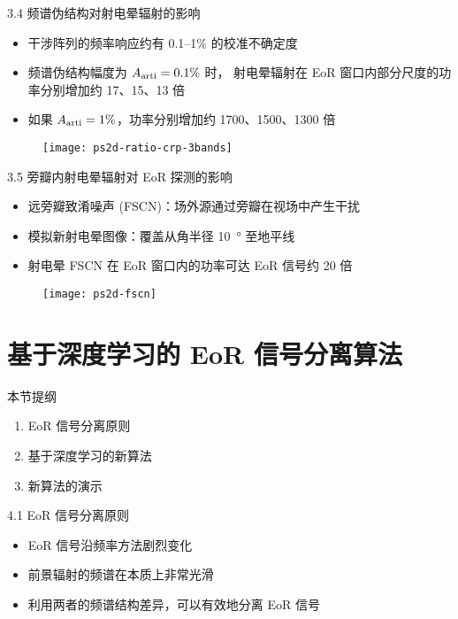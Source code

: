 \documentclass{beamer}
\begin{document}
\begin{frame}{3.4 频谱伪结构对射电晕辐射的影响}
  \begin{itemize}
    \item 干涉阵列的频率响应约有 0.1--1\% 的校准不确定度
    \item 频谱伪结构幅度为 $A_{\text{arti}} = 0.1\%$ 时，
      射电晕辐射在 EoR 窗口内部分尺度的功率分别增加约 17、15、13 倍
    \item 如果 $A_{\text{arti}} = 1\%$，功率分别增加约 1700、1500、1300 倍
  \end{itemize}
  \begin{figure}
    \centering
    \texttt{[image: ps2d-ratio-crp-3bands]}
  \end{figure}
\end{frame}

\begin{frame}{3.5 旁瓣内射电晕辐射对 EoR 探测的影响}
  \begin{itemize}
    \item \alert{远旁瓣致淆噪声 (FSCN)}：场外源通过旁瓣在视场中产生干扰
    \item 模拟新射电晕图像：覆盖从角半径 \SI{10}{\degree} 至地平线
    \item 射电晕 FSCN 在 EoR 窗口内的功率可达 EoR 信号约 20 倍
  \end{itemize}
  \begin{figure}
    \centering
    \texttt{[image: ps2d-fscn]}
  \end{figure}
\end{frame}


\section{基于深度学习的 EoR 信号分离算法}

\begin{frame}
  \begin{block}{本节提纲}
  \begin{enumerate}
    \item EoR 信号分离原则
    \item 基于深度学习的新算法
    \item 新算法的演示
  \end{enumerate}
  \end{block}
\end{frame}

\begin{frame}{4.1 EoR 信号分离原则}
  \begin{itemize}
    \item EoR 信号沿频率方法剧烈变化
    \item 前景辐射的频谱在本质上非常光滑
    \item 利用两者的频谱结构差异，可以有效地分离 EoR 信号
  \end{itemize}
\end{frame}
\end{document}
